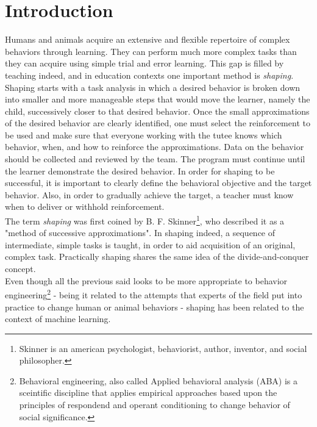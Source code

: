 \chapter{Introduction}
Humans and animals acquire an extensive and flexible repertoire of complex behaviors through learning. They can perform
much more complex tasks than they can acquire using simple trial and error learning. 
This gap is filled by teaching indeed, and in education contexts one important method is \textit{shaping}. Shaping starts with a task analysis in which a desired
behavior is broken down into smaller and more manageable steps that would move the learner, namely the child, successively closer to that desired behavior. Once the small approximations of the desired behavior are clearly
identified, one must select the reinforcement to be used and make sure that everyone working with the tutee knows which behavior, when, and how to reinforce the approximations.
Data on the behavior should be collected and reviewed by the team. The program must continue until the learner demonstrate the desired behavior.
In order for shaping to be successful, it is important to clearly define the behavioral objective and the target behavior. Also, in order to gradually achieve the target, 
a teacher must know when to deliver or withhold reinforcement. \\
The term \textit{shaping} was first coined 
by B. F. Skinner\footnote{Skinner is an american psychologist, behaviorist, author, inventor, and social philosopher.}, 
who described it as a "method of successive approximations". In shaping indeed, a sequence of intermediate, simple tasks is taught, in order to aid acquisition of an original,
complex task. Practically shaping shares the same idea of the divide-and-conquer concept.\\
Even though all the previous said looks to be more appropriate
to behavior engineering\footnote{Behavioral engineering, also called Applied behavioral analysis (ABA) is a sceintific discipline that applies
empirical approaches based upon the principles of respondend and operant conditioning to change behavior of social significance.}
- being it related to the attempts that experts of the field put into practice to change human or animal behaviors - 
shaping has been related to the context of machine learning.\\

